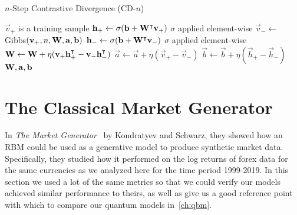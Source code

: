 \begin{algorithm}
\caption{$n$-Step Contrastive Divergence (CD-$n$)}
\begin{algorithmic}[1]
        \Comment $\vec{v}_+$ is a training sample
        \State $\mathbf{h}_+ \gets \sigma(\mathbf{b} + \mathbf{W}^\intercal\mathbf{v}_+)$
            \Comment $\sigma$ applied element-wise
        \State $\vec{v}_- \gets$ Gibbs$(\mathbf{v}_+,n,\mathbf{W},\mathbf{a},\mathbf{b})$
        \State $\mathbf{h}_- \gets \sigma(\mathbf{b} + \mathbf{W}^\intercal\mathbf{v}_-)$
            \Comment $\sigma$ applied element-wise
        \State $\mathbf{W} \gets \mathbf{W} + \eta(\mathbf{v}_+ \mathbf{h}_+^\intercal - \mathbf{v}_- \mathbf{h}_-^\intercal)$
        \State $\vec{a} \gets \vec{a} + \eta(\vec{v}_+ - \vec{v}_-)$
        \State $\vec{b} \gets \vec{b} + \eta(\vec{h}_+ - \vec{h}_-)$
        \State \Return $\mathbf{W}, \mathbf{a}, \mathbf{b}$
    \EndProcedure
\end{algorithmic}
\label{alg:CDn}
\end{algorithm}


\section{The Classical Market Generator}\label{sec:classical_market_generator}
In \textit{The Market Generator}~\cite{kondratyev_2019} by Kondratyev and Schwarz, they showed how an RBM could be used as a generative model to produce synthetic market data.
Specifically, they studied how it performed on the log returns of forex data for the same currencies as we analyzed here for the time period 1999-2019.
In this section we used a lot of the same metrics so that we could verify our models achieved similar performance to theirs, as well as give us a good reference point with which to compare our quantum models in~\cref{ch:qbm}.


